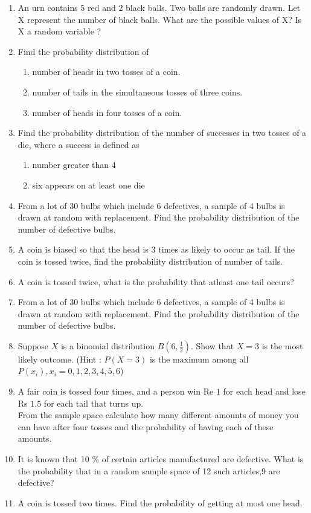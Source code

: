 \begin{enumerate}[label=\thesection.\arabic*,ref=\thesection.\theenumi]
\item An urn contains 5 red and 2 black balls. Two balls are randomly drawn. Let X
represent the number of black balls. What are the possible values of X? Is X a
random variable ? 
\item Find the probability distribution of
\begin{enumerate}
\item number of heads in two tosses of a coin.
\item number of tails in the simultaneous tosses of three coins.
\item number of heads in four tosses of a coin.
\end{enumerate}

\item Find the probability distribution of the number of successes in two tosses of a die,
where a success is defined as
\begin{enumerate}
\item number greater than 4
\item six appears on at least one die
\end{enumerate}
\item From a lot of 30 bulbs which include 6 defectives, a sample of 4 bulbs is drawn
at random with replacement. Find the probability distribution of the number of
defective bulbs.
\item A coin is biased so that the head is 3 times as likely to occur as tail. If the coin is
tossed twice, find the probability distribution of number of tails.
\item A coin is tossed twice, what is the probability that atleast one tail occurs?
\\
\solution

\item From a lot of 30 bulbs which include 6 defectives, a sample of 4 bulbs is drawn
at random with replacement. Find the probability distribution of the number of
defective bulbs.
 \item Suppose $X$ is a binomial distribution $B\left(6,\frac{1}{2}\right)$. Show that $X=3$ is the most likely outcome.
(Hint : $P(X=3)$ is the maximum among all $P(x_i),x_i=0,1,2,3,4,5,6$)

\item A fair coin is tossed four times, and a person win Re $1$ for each head and lose Rs $1.5$ for each tail that turns up.\\
From the sample space calculate how many different amounts of money you can have after four tosses and the probability of having each of these amounts.
\\
\solution

\item It is known that 10 $\%$ of certain articles manufactured are defective. What is the probability that in a random sample space of 12 such articles,9 are defective? \\
\solution

\item A coin is tossed two times. Find the probability of getting at most one head.
\\
\solution

    \end{enumerate}

